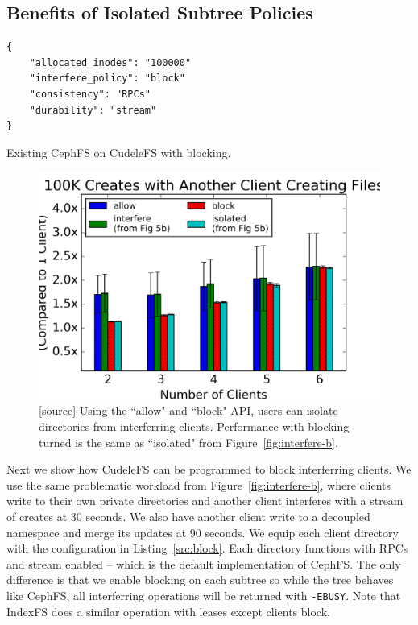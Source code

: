 \subsection{Benefits of Isolated Subtree Policies}

\begin{listing}[tb]
\begin{verbatim}
{     
    "allocated_inodes": "100000"
    "interfere_policy": "block"
    "consistency": "RPCs"
    "durability": "stream"
}
\end{verbatim}
\caption{Existing CephFS on CudeleFS with blocking.}
\label{src:block}
\end{listing}

\begin{figure}[tb]
\centering
\includegraphics[width=1.0\linewidth]{graphs/slowdown-allow-block.png}
\caption{
[\href{https://github.com/michaelsevilla/cudele-popper/blob/master/viz-blockallow.ipynb}{source}]
Using the ``allow" and ``block" API, users can isolate directories from
interferring clients. Performance with blocking turned is the same as
``isolated" from Figure~\ref{fig:interfere-b}.
\label{fig:slowdown-allow-block}}
\end{figure}

Next we show how CudeleFS can be programmed to block interferring clients. We
use the same problematic workload from Figure~\ref{fig:interfere-b}, where
clients write to their own private directories and another client interferes with a stream of creates at
30 seconds.  We also have another client write to a decoupled namespace and
merge its updates at 90 seconds.  We equip each client directory with the
configuration in Listing~\ref{src:block}.  Each directory functions with RPCs
and stream enabled -- which is the default implementation of CephFS. The only
difference is that we enable blocking on each subtree so while the tree behaves
like CephFS, all interferring operations will be returned with \texttt{-EBUSY}.
Note that IndexFS does a similar operation with leases except clients block.

